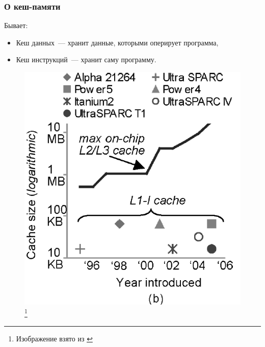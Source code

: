 \documentclass{beamer}
\begin{document}
\begin{frame}
\frametitle{О кеш-памяти}

Бывает:
\begin{itemize}
  \item Кеш данных~--- хранит данные, которыми оперирует программа,
  \item Кеш инструкций~--- хранит саму программу.
\end{itemize}

\begin{figure}[htb]
\includegraphics[width=\textwidth,height=0.63\textheight,keepaspectratio]{cache1.png} 
\footnote{\tiny{Изображение взято из \cite{Harizopoulos2006}}}
\end{figure}   

\end{frame}
\end{document}
